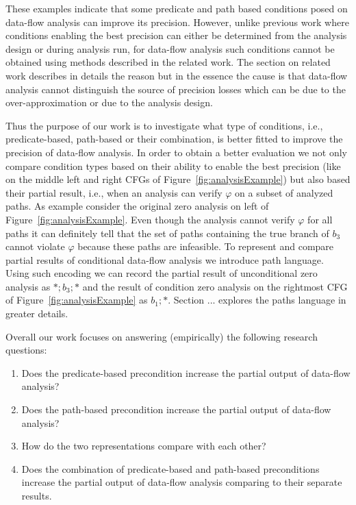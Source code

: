 These examples indicate that some predicate and path based conditions posed on data-flow analysis can improve its precision. However, unlike previous work where conditions enabling the best precision can either be determined from the analysis design or during analysis run, for data-flow analysis such conditions cannot be obtained  using methods described in the related work. The section on related work describes in details the reason but in the essence the cause is that data-flow analysis cannot distinguish the source of precision losses which can be due to the over-approximation or due to the analysis design.

Thus the purpose of our work is to investigate what type of conditions, i.e., predicate-based, path-based or their combination, is better fitted to improve the precision of data-flow analysis. In order to obtain a better evaluation we not only compare condition types based on their ability to enable the best precision (like on the middle left and right CFGs of Figure~\ref{fig:analysisExample}) but also based their partial result, i.e., when an analysis can verify $\varphi$ on a subset of analyzed paths. As example consider the original zero analysis on left of Figure~\ref{fig:analysisExample}. Even though the analysis cannot verify $\varphi$ for all paths it can definitely tell that the set of paths containing the true branch of $b_3$ cannot violate $\varphi$ because these paths are infeasible. To represent and compare partial results of conditional data-flow analysis we introduce path language. Using such encoding we can record the partial result of unconditional zero analysis as $*;b_3;*$ and the result of condition zero analysis on the rightmost CFG of Figure~\ref{fig:analysisExample} as $b_1;*$. Section ... explores the paths language in greater details.

Overall our work focuses on answering (empirically) the following research questions:
\begin{enumerate}
\item Does the predicate-based precondition increase the partial output of data-flow analysis?
\item Does the path-based precondition increase the partial output of data-flow analysis?
\item How do the two representations compare with each other?
\item Does the combination of predicate-based and path-based preconditions increase the partial output of data-flow analysis comparing to their separate results.
\end{enumerate}

